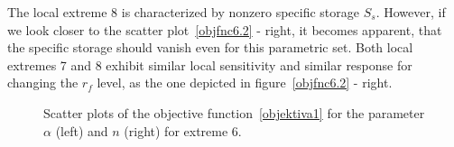 \documentclass[review]{elsarticle}
\begin{document}
The local extreme 8 is characterized by nonzero specific storage $S_s$. However, if we look closer to the scatter plot~\ref{objfnc6.2} - right, it becomes apparent, that the specific storage should vanish even for this parametric set. Both local extremes 7 and 8 exhibit similar local sensitivity and similar response for changing the $r_f$ level, as the one depicted in figure~\ref{objfnc6.2} - right.




\begin{figure}
\caption{Scatter plots of the objective function~\eqref{objektiva1} for the parameter $\alpha$ (left) and $n$ (right) for extreme 6.}
\label{objfnc6}
\end{figure}
\end{document}
